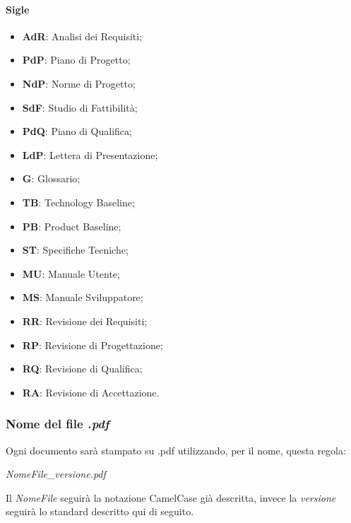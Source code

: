 	\paragraph{Sigle}
	\begin{itemize}
		\item \textbf{AdR}: Analisi dei Requisiti;
		\item \textbf{PdP}: Piano di Progetto;
		\item \textbf{NdP}: Norme di Progetto;
		\item \textbf{SdF}: Studio di Fattibilità;
		\item \textbf{PdQ}: Piano di Qualifica;
		\item \textbf{LdP}: Lettera di Presentazione;
		\item \textbf{G}: Glossario;
		\item \textbf{TB}: Technology Baseline;
		\item \textbf{PB}: Product Baseline;
		\item \textbf{ST}: Specifiche Tecniche;
		\item \textbf{MU}: Manuale Utente;
		\item \textbf{MS}: Manuale Sviluppatore;
		\item \textbf{RR}: Revisione dei Requisiti;
		\item \textbf{RP}: Revisione di Progettazione;
		\item \textbf{RQ}: Revisione di Qualifica;
		\item \textbf{RA}: Revisione di Accettazione.
	\end{itemize}

\begin{comment}
	\subsubsection{Componenti grafiche}
	\textcolor{red}{Da controllare, quando inizieremo ad usarle}
	\begin{itemize}
		\item Tabelle
		\item Immagini
	\end{itemize}
\end{comment}
	\subsubsection{Nome del file \emph{.pdf}}
	Ogni documento sarà stampato su .pdf utilizzando, per il nome, questa regola:
	\begin{center}
		\emph{NomeFile\_versione.pdf}
	\end{center}
	Il \emph{NomeFile} seguirà la notazione CamelCase già descritta, invece la \emph{versione} seguirà lo standard descritto qui di seguito.
	
